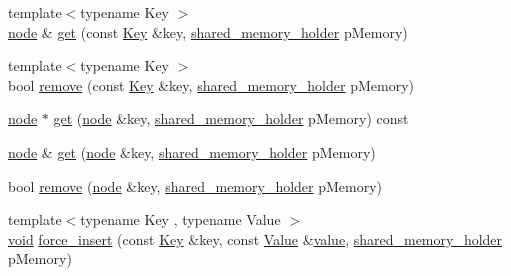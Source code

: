 \begin{DoxyCompactItemize}
{\footnotesize template$<$typename Key $>$ }\\\mbox{\hyperlink{class_y_a_m_l_1_1detail_1_1node}{node}} \& \mbox{\hyperlink{class_y_a_m_l_1_1detail_1_1node__data_a0037d5cd297e625e56151089bf805108}{get}} (const \mbox{\hyperlink{namespace_y_a_m_l_a67c320aa50d3de7ecba1d0b8775dd684a1af533fc24b0311b8c4d5ac2870283aa}{Key}} \&key, \mbox{\hyperlink{namespace_y_a_m_l_1_1detail_a228c4b3b6ba1058b474d40afc218e21d}{shared\+\_\+memory\+\_\+holder}} p\+Memory)
\item 
{\footnotesize template$<$typename Key $>$ }\\bool \mbox{\hyperlink{class_y_a_m_l_1_1detail_1_1node__data_aec83cdc1932b604c83c76cea09a9e3a1}{remove}} (const \mbox{\hyperlink{namespace_y_a_m_l_a67c320aa50d3de7ecba1d0b8775dd684a1af533fc24b0311b8c4d5ac2870283aa}{Key}} \&key, \mbox{\hyperlink{namespace_y_a_m_l_1_1detail_a228c4b3b6ba1058b474d40afc218e21d}{shared\+\_\+memory\+\_\+holder}} p\+Memory)
\item 
\mbox{\hyperlink{class_y_a_m_l_1_1detail_1_1node}{node}} $\ast$ \mbox{\hyperlink{class_y_a_m_l_1_1detail_1_1node__data_ac1a3262f2fcb0a6a495b8b4e1360c8b8}{get}} (\mbox{\hyperlink{class_y_a_m_l_1_1detail_1_1node}{node}} \&key, \mbox{\hyperlink{namespace_y_a_m_l_1_1detail_a228c4b3b6ba1058b474d40afc218e21d}{shared\+\_\+memory\+\_\+holder}} p\+Memory) const
\item 
\mbox{\hyperlink{class_y_a_m_l_1_1detail_1_1node}{node}} \& \mbox{\hyperlink{class_y_a_m_l_1_1detail_1_1node__data_a48cb46dc2d9bd53fc34e2e96828992e9}{get}} (\mbox{\hyperlink{class_y_a_m_l_1_1detail_1_1node}{node}} \&key, \mbox{\hyperlink{namespace_y_a_m_l_1_1detail_a228c4b3b6ba1058b474d40afc218e21d}{shared\+\_\+memory\+\_\+holder}} p\+Memory)
\item 
bool \mbox{\hyperlink{class_y_a_m_l_1_1detail_1_1node__data_ab3b73a9b51d5d7063f46050e27dfeebc}{remove}} (\mbox{\hyperlink{class_y_a_m_l_1_1detail_1_1node}{node}} \&key, \mbox{\hyperlink{namespace_y_a_m_l_1_1detail_a228c4b3b6ba1058b474d40afc218e21d}{shared\+\_\+memory\+\_\+holder}} p\+Memory)
\item 
{\footnotesize template$<$typename Key , typename Value $>$ }\\\mbox{\hyperlink{glad_8h_a950fc91edb4504f62f1c577bf4727c29}{void}} \mbox{\hyperlink{class_y_a_m_l_1_1detail_1_1node__data_a6811d89b2b41ed4bca74242ddb61127e}{force\+\_\+insert}} (const \mbox{\hyperlink{namespace_y_a_m_l_a67c320aa50d3de7ecba1d0b8775dd684a1af533fc24b0311b8c4d5ac2870283aa}{Key}} \&key, const \mbox{\hyperlink{namespace_y_a_m_l_a67c320aa50d3de7ecba1d0b8775dd684a0d29a86853d6a9cfe0241ab7ea8da97c}{Value}} \&\mbox{\hyperlink{glad_8h_a03aff08f73d7fde3d1a08e0abd8e84fa}{value}}, \mbox{\hyperlink{namespace_y_a_m_l_1_1detail_a228c4b3b6ba1058b474d40afc218e21d}{shared\+\_\+memory\+\_\+holder}} p\+Memory)
\end{DoxyCompactItemize}
